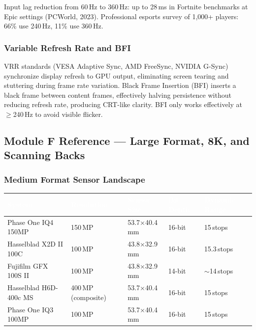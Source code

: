 \documentclass[11pt,letterpaper]{article}
\newcommand{\tableheader}[1]{\textbf{\sffamily\textcolor{white}{#1}}}
\begin{document}
Input lag reduction from 60\,Hz to 360\,Hz: up to 28\,ms in Fortnite benchmarks at Epic settings
(PCWorld, 2023). Professional esports survey of 1,000+ players: 66\% use 240\,Hz, 11\% use 360\,Hz.

\subsubsection{Variable Refresh Rate and BFI}

VRR standards (VESA Adaptive Sync, AMD FreeSync, NVIDIA G-Sync) synchronize display refresh to GPU
output, eliminating screen tearing and stuttering during frame rate variation. Black Frame Insertion
(BFI) inserts a black frame between content frames, effectively halving persistence without reducing
refresh rate, producing CRT-like clarity. BFI only works effectively at $\geq$240\,Hz to avoid
visible flicker.

\subsection{Module F Reference --- Large Format, 8K, and Scanning Backs}

\subsubsection{Medium Format Sensor Landscape}

\begin{center}
\begin{tabularx}{\textwidth}{L{3.5cm}C{2cm}C{2.5cm}C{2cm}C{1.5cm}}
\toprule
{}
\tableheader{System} & \tableheader{Resolution} & \tableheader{Sensor Size} & \tableheader{Bit Depth} & \tableheader{Dynamic Range} \\
\midrule
Phase One IQ4 150MP & 150\,MP & 53.7$\times$40.4\,mm & 16-bit & 15\,stops \\
Hasselblad X2D II 100C & 100\,MP & 43.8$\times$32.9\,mm & 16-bit & 15.3\,stops \\
Fujifilm GFX 100S II & 100\,MP & 43.8$\times$32.9\,mm & 14-bit & $\sim$14\,stops \\
Hasselblad H6D-400c MS & 400\,MP (composite) & 53.7$\times$40.4\,mm & 16-bit & 15\,stops \\
Phase One IQ3 100MP & 100\,MP & 53.7$\times$40.4\,mm & 16-bit & 15\,stops \\
\bottomrule
\end{tabularx}
\end{center}
\end{document}
